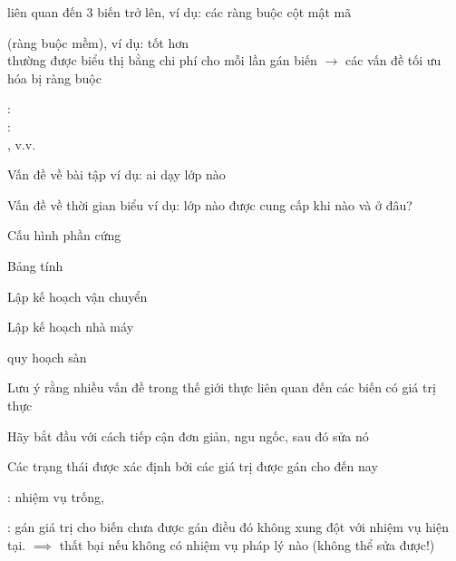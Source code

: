 \documentclass{article}
\begin{document}
\begin{huge}
 liên quan đến 3 biến trở lên,\al
   ví dụ: các ràng buộc cột mật mã

 (ràng buộc mềm), ví dụ:  tốt hơn \\
thường được biểu thị bằng chi phí cho mỗi lần gán biến \al
$\rightarrow$ các vấn đề tối ưu hóa bị ràng buộc



\vspace*{0.3in}

\textwidth
{}

: \\
: \\
\al
{}\al
{}, v.v.




Vấn đề về bài tập \al
    ví dụ: ai dạy lớp nào

Vấn đề về thời gian biểu\al
    ví dụ: lớp nào được cung cấp khi nào và ở đâu?

Cấu hình phần cứng

Bảng tính

Lập kế hoạch vận chuyển

Lập kế hoạch nhà máy

quy hoạch sàn

\vspace*{0.3in}

Lưu ý rằng nhiều vấn đề trong thế giới thực liên quan đến các biến có giá trị thực



Hãy bắt đầu với cách tiếp cận đơn giản, ngu ngốc, sau đó sửa nó

Các trạng thái được xác định bởi các giá trị được gán cho đến nay

\blob {}: nhiệm vụ trống, \mat{$\emptyset$}

\blob {}: gán giá trị cho biến chưa được gán\nl
điều đó không xung đột với nhiệm vụ hiện tại.\nl
$\implies$ thất bại nếu không có nhiệm vụ pháp lý nào (không thể sửa được!)


\end{huge}
\end{document}
